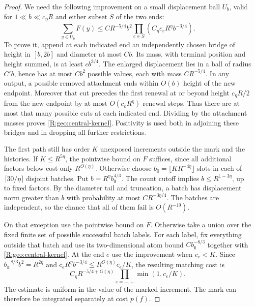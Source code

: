 \begin{proof}
We need the following improvement on a small displacement ball $U_b$,
valid for $1\ll b\ll c_\eta R$ and either subset $S$ of the two ends:
\begin{equation}\label{R:geo:central-kernel}
 \sum_{y\in U_b}F(y)\le CR^{-5/4}b^2
           \prod_{e\in S}(C_\eta c_eR^\eta b^{-3/4}).
\end{equation}
To prove it, append at each indicated end an independently chosen
bridge of height in $[b,2b]$ and diameter at most $Cb$.
Its mass, with terminal position and height summed, is at least
$c b^{3/4}$.  The enlarged displacement lies in a ball of radius
$C'b$, hence has at most $Cb^2$ possible values, each with mass
$CR^{-5/4}$.  In any output, a possible removed attachment ends
within $O(b)$ height of the new endpoint.  Moreover that cut precedes
the first renewal at or beyond height $c_\eta R/2$ from the new endpoint by at most
$O(c_eR^\eta)$ renewal steps.  Thus there are at most that many
possible cuts at each indicated end.  Dividing by the attachment
masses proves \eqref{R:geo:central-kernel}.  Positivity is used both
in adjoining these bridges and in dropping all further restrictions.

The first path still has order $K$ unexposed increments outside the
mark and the histories.  If $K\le R^{5\eta}$, the pointwise bound
on $F$ suffices, since all additional factors below cost only
$R^{O(\eta)}$.  Otherwise choose
$b_0=\lfloor KR^{-4\eta}\rfloor$ slots in each of
$\lceil30/\eta\rceil$ disjoint batches.  Put
$b=R^\eta b_0^{4/3}$.  The count cutoff implies
$b\le R^{1-3\eta}$, up to fixed factors.  By the diameter tail and
truncation, a batch has displacement norm greater than $b$ with
probability at most $C R^{-3\eta/4}$.  The batches are independent,
so the chance that all of them fail is $O(R^{-10})$.

On that exception use the pointwise bound on $F$.  Otherwise take a
union over the fixed finite set of possible successful batch labels.
For each label, fix everything outside that batch and use its
two-dimensional atom bound $C b_0^{-8/3}$ together with
\eqref{R:geo:central-kernel}.  At the end $e$ use the improvement
when $c_e<K$.  Since $b_0^{-8/3}b^2=R^{2\eta}$ and
$c_eR^\eta b^{-3/4}\le R^{O(\eta)}c_e/K$, the resulting matching
cost is
\begin{equation}\label{R:geo:matching-cost}
 C_\eta R^{-5/4+O(\eta)}
                  \prod_{e=-,+}\min(1,c_e/K).
\end{equation}
The estimate is uniform in the value of the marked increment.
The mark can therefore be integrated separately at cost $p(f)$.


\end{proof}
